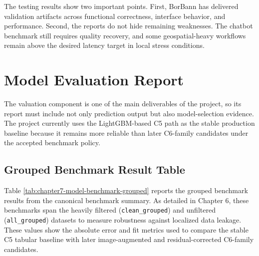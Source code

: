 The testing results show two important points. First, BorBann has delivered validation artifacts across functional correctness, interface behavior, and performance. Second, the reports do not hide remaining weaknesses. The chatbot benchmark still requires quality recovery, and some geospatial-heavy workflows remain above the desired latency target in local stress conditions.

\section{Model Evaluation Report}

The valuation component is one of the main deliverables of the project, so its report must include not only prediction output but also model-selection evidence. The project currently uses the LightGBM-based C5 path as the stable production baseline because it remains more reliable than later C6-family candidates under the accepted benchmark policy.

\subsection{Grouped Benchmark Result Table}

Table \ref{tab:chapter7-model-benchmark-grouped} reports the grouped benchmark results from the canonical benchmark summary. As detailed in Chapter 6, these benchmarks span the heavily filtered (\texttt{clean\_grouped}) and unfiltered (\texttt{all\_grouped}) datasets to measure robustness against localized data leakage. These values show the absolute error and fit metrics used to compare the stable C5 tabular baseline with later image-augmented and residual-corrected C6-family candidates.

